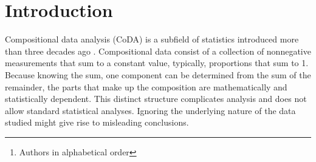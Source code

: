 \documentclass{article}
\title{\papertitle} %
\author{Marta Avalos-Fernandez$^\dagger$~~Richard Nock$^\ddagger$$^\S$$^\natural$~~Cheng Soon Ong$^\ddagger$$^\S$~~Julien Rouar$^\dagger$~~Ke Sun$^\ddagger$
\thanks{Authors in alphabetical order}\\
  $^\dagger$Universit\'e de Bordeaux,~~$^\ddagger$Data61,\\
  $^\S$the Australian National University and $^\natural$the University of Sydney\\
  \texttt{first.last@\{u-bordeaux.fr,data61.csiro.au\}}}
\date{\empty}
\begin{document}
\maketitle

\doparttoc %
\faketableofcontents %

\begin{abstract}
  We consider the problem of learning a low dimensional representation for
  compositional data. Compositional data consists of a collection of nonnegative data
  that sum to a constant value. Since the parts of the collection are statistically
  dependent, many standard tools cannot be directly applied. Instead, compositional data must
  be first transformed before analysis. Focusing on
  principal component analysis (PCA), we propose an approach that allows low dimensional
  representation learning directly from the original data.
  Our approach combines the benefits of the log-ratio transformation from compositional
  data analysis and exponential family PCA.
  A key tool in its derivation is a generalization of the scaled Bregman
  theorem, that relates the perspective transform of a Bregman
  divergence to the Bregman divergence of a perspective transform and
  a \textit{remainder} conformal divergence.
  Our proposed approach includes a convenient surrogate (upper bound) loss of
  the exponential family PCA which
  has an easy to optimize form.
  We also derive the corresponding
  form for nonlinear autoencoders. Experiments on simulated data and microbiome data show
  the promise of our method.
\end{abstract}

\section{Introduction}

Compositional data analysis (CoDA)
is a subfield of statistics introduced more than three decades ago \cite{aTSB,aPCA,aTSJ,pbCD}.
Compositional data consist of a collection of nonnegative measurements that sum to a constant value, typically, proportions that sum to 1.
Because knowing the sum, one component can be determined from the sum of the remainder, the parts that make up the composition are mathematically and statistically dependent.
This distinct structure complicates analysis and does not allow standard statistical analyses. Ignoring the underlying nature of the data studied might give rise to misleading conclusions.
\end{document}
